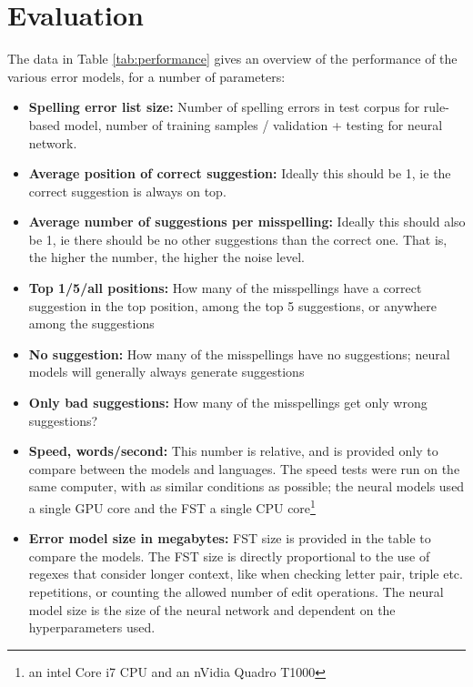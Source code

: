 \documentclass{flammie}
\begin{document}
\section{Evaluation}


The data in Table \ref{tab:performance} gives an overview of the performance of
the various error models, for a number of parameters:

\begin{itemize}
\item \textbf{Spelling error list size:} Number of spelling errors in test
    corpus for rule-based model, number of training samples / validation +
        testing for neural network.
\item \textbf{Average position of correct suggestion:} Ideally this should be 1,
    ie the correct suggestion is always on top.
\item \textbf{Average number of suggestions per misspelling:} Ideally this
    should also be 1, ie there should be no other suggestions than the correct
        one. That is, the higher the number, the higher the noise level.
\item \textbf{Top 1/5/all positions:} How many of the misspellings have a
    correct suggestion in the top position, among the top 5 suggestions, or
        anywhere among the suggestions
\item \textbf{No suggestion:} How many of the misspellings have no suggestions;
    neural models will generally always generate suggestions
\item \textbf{Only bad suggestions:} How many of the misspellings get only wrong
    suggestions?
\item \textbf{Speed, words/second:} This number is relative, and is provided
    only to compare between the models and languages. The speed tests were run
        on the same computer, with as similar conditions as possible; the neural
        models used a single GPU core and the FST a single CPU core\footnote{an
        intel Core i7 CPU and an nVidia Quadro T1000}
\item \textbf{Error model size in megabytes:} FST size is provided in the table
    to compare the models. The FST size is directly proportional to the use of
        regexes that consider longer context, like when checking letter pair,
        triple etc. repetitions, or counting the allowed number of edit
        operations. The neural model size is the size of the neural network and
        dependent on the hyperparameters used.
\end{itemize}
\end{document}
